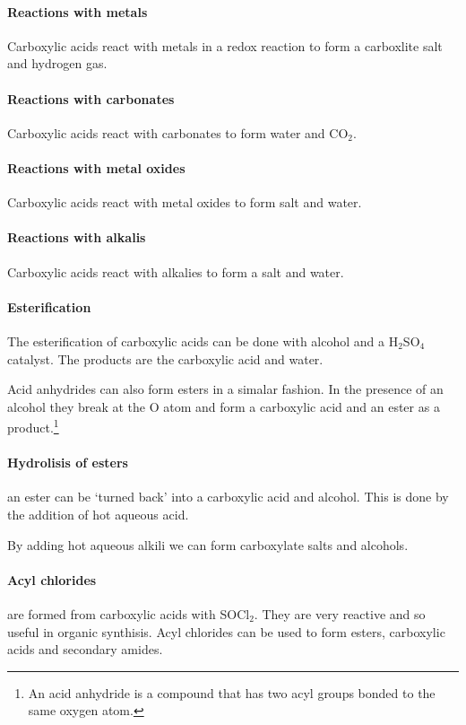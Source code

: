 {	\paragraph{Reactions with metals} Carboxylic acids react with metals in a redox reaction to form a carboxlite salt and hydrogen gas.
	
	\paragraph{Reactions with carbonates} Carboxylic acids react with carbonates to form water and CO$_2$.
	
	\paragraph{Reactions with metal oxides} Carboxylic acids react with metal oxides to form salt and water.
	
	\paragraph{Reactions with alkalis} Carboxylic acids react with alkalies to form a salt and water.
	
	
	\paragraph{Esterification} The esterification of carboxylic acids can be done with alcohol and a H$_2$SO$_4$ catalyst.
	The products are the carboxylic acid and water.
	
	Acid anhydrides can also form esters in a simalar fashion. 
	In the presence of an alcohol they break at the O atom and form a carboxylic acid and an ester as a product.\footnote{An acid anhydride is a compound that has two acyl groups bonded to the same oxygen atom.}
	
	
	\paragraph{Hydrolisis of esters} an ester can be `turned back' into a carboxylic acid and alcohol.
	This is done by the addition of hot aqueous acid.
	
	By adding hot aqueous alkili we can form carboxylate salts and alcohols.
	
	\paragraph{Acyl chlorides} are formed from carboxylic acids with SOCl$_2$.
	They are very reactive and so useful in organic synthisis.
	Acyl chlorides can be used to form esters, carboxylic acids and secondary amides.
	
}
